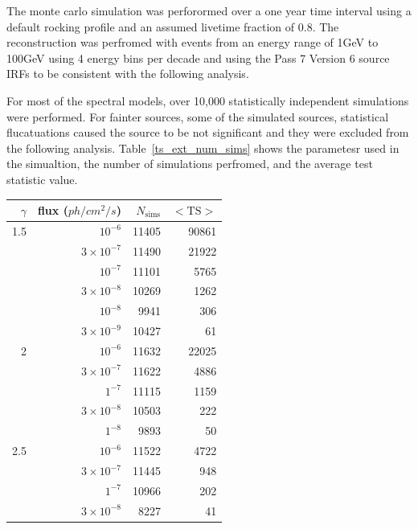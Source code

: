 \documentclass{emulateapj}
\begin{document}
The monte carlo simulation was perforormed over a one year time interval using
a default rocking profile and an assumed livetime fraction of 0.8.
The reconstruction was perfromed with events from an energy range of
1GeV to 100GeV using 4 energy bins per decade and using the Pass 7 Version 6
source IRFs to be consistent with the following analysis.

For most of the spectral models, over 10,000 statistically independent simulations were performed.
For fainter sources, some of the simulated sources, statistical flucatuations
caused the source to be not significant and they were excluded from the following analysis.
Table~\ref{ts_ext_num_sims} shows the parametesr used in the simualtion,
the number of simulations perfromed, and the average test statistic value.

\begin{table}
  \begin{centering}
\begin{tabular}{ | r | r | r | r | }
\hline
$\gamma$ & flux ($ph/cm^2/s$) & $N_\text{sims}$ & $<\text{TS}>$ \\
\hline
  1.5 &          $10^{-6}$ &           11405 &  90861 \\
      &  $3\times 10^{-7}$ &           11490 &  21922 \\
      &          $10^{-7}$ &           11101 &   5765 \\
      &  $3\times 10^{-8}$ &           10269 &   1262 \\
      &          $10^{-8}$ &            9941 &    306 \\
      &  $3\times 10^{-9}$ &           10427 &     61 \\
\hline
    2 &          $10^{-6}$ &           11632 &  22025 \\
      &  $3\times 10^{-7}$ &           11622 &   4886 \\
      &           $1^{-7}$ &           11115 &   1159 \\
      &  $3\times 10^{-8}$ &           10503 &    222 \\
      &           $1^{-8}$ &            9893 &     50 \\
\hline
  2.5 &          $10^{-6}$ &           11522 &   4722 \\
      &  $3\times 10^{-7}$ &           11445 &    948 \\
      &           $1^{-7}$ &           10966 &    202 \\
      &  $3\times 10^{-8}$ &            8227 &     41 \\

\end{tabular}
\end{centering}
\end{table}
\end{document}
